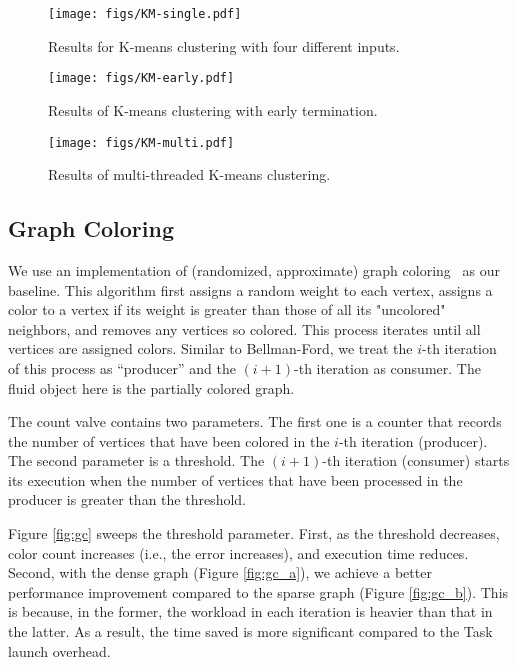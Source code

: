 \begin{figure*}[t]
\vspace{4pt}
\centering
    \begin{minipage}{.3\textwidth}
    \centering
	\texttt{[image: figs/KM-single.pdf]}
	\vspace{-8pt}\caption{Results for K-means clustering with four different inputs.}
	\label{figs:km-single}
    \end{minipage}\hspace{0.cm}
    \begin{minipage}{0.3\textwidth}
    \centering
    \texttt{[image: figs/KM-early.pdf]}
    \vspace{-8pt}\caption{Results of K-means clustering with early termination.}
    \label{figs:kmeans-et}
    \end{minipage}
    \begin{minipage}{0.3\textwidth}
    \centering
    \texttt{[image: figs/KM-multi.pdf]}
    \vspace{-8pt}\caption{Results of multi-threaded K-means clustering.}
    \label{figs:kmeans-multi}
    \end{minipage}\vspace{-8pt}
\end{figure*}

\subsection{Graph Coloring}
\label{sec:gc}
We use an implementation of (randomized, approximate) graph coloring~\cite{hpca} as our baseline. This algorithm first assigns a random weight to each vertex, assigns a color to a vertex if its weight is greater than those of all its "uncolored" neighbors, and removes any vertices so colored. This process iterates until all vertices are assigned colors. Similar to Bellman-Ford, we treat the $i$-th iteration of this process as ``producer'' and the $(i+1)$-th iteration as consumer. The fluid object here is the partially colored graph.

The count valve contains two parameters. The first one is a counter that records the number of vertices that have been colored in the $i$-th iteration (producer). The second parameter is a threshold. The $(i+1)$-th iteration (consumer) starts its execution when the number of vertices that have been processed in the producer is greater than the threshold. 

Figure \ref{fig:gc} sweeps the threshold parameter. First, as the threshold decreases, color count increases (i.e., the error increases), and execution time reduces. Second, with the dense graph (Figure \ref{fig:gc_a}), we achieve a better performance improvement compared to the sparse graph (Figure \ref{fig:gc_b}). This is because, in the former, the workload in each iteration is heavier than that in the latter. As a result, the time saved is more significant compared to the Task launch overhead. 

